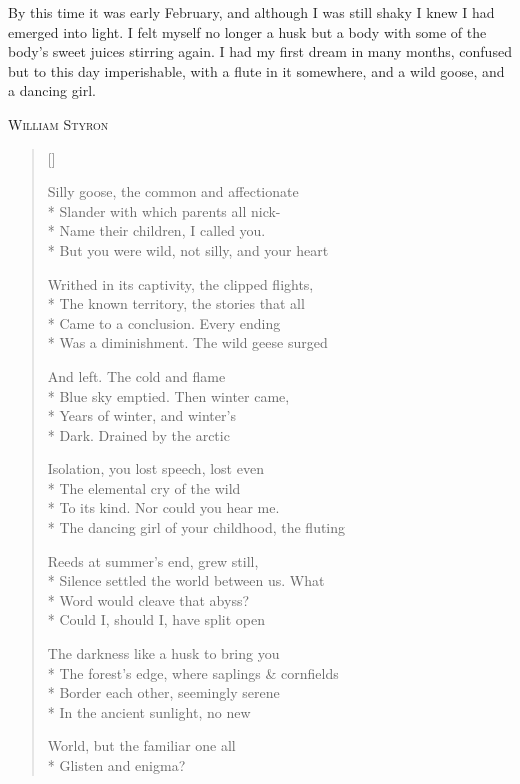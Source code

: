 \label{ch:darknessvisible}
\begingroup
\setlength\epigraphwidth{9cm}
\epigraph{By this time it was early February, and although I was still shaky I knew I had emerged into light. I felt myself no longer a husk but a body with some of the body's sweet juices stirring again. I had my first dream in many months, confused but to this day imperishable, with a flute in it somewhere, and a wild goose, and a dancing girl.}{\textsc{William Styron}}
\endgroup

\settowidth{\versewidth}{The forest's edge, where saplings \& cornfields}
\begin{verse}[\versewidth]

Silly goose, the common and affectionate\\*
Slander with which parents all nick-\\*
Name their children, I called you.\\*
But you were wild, not silly, and your heart

Writhed in its captivity, the clipped flights,\\*
The known territory, the stories that all\\*
Came to a conclusion. Every ending\\*
Was a diminishment. The wild geese surged

And left. The cold and flame\\*
Blue sky emptied.  Then winter came,\\*
Years of winter, and winter's\\*
Dark. Drained by the arctic

Isolation, you lost speech, lost even\\*
The elemental cry of the wild\\*
To its kind. Nor could you hear me.\\*
The dancing girl of your childhood, the fluting

Reeds at summer's end, grew still,\\*
Silence settled the world between us. What\\*
Word would cleave that abyss?\\*
Could I, should I, have split open

The darkness like a husk to bring you\\*
The forest's edge, where saplings \& cornfields\\*
Border each other, seemingly serene\\*
In the ancient sunlight, no new

World, but the familiar one all\\*
Glisten and enigma?
\end{verse}
